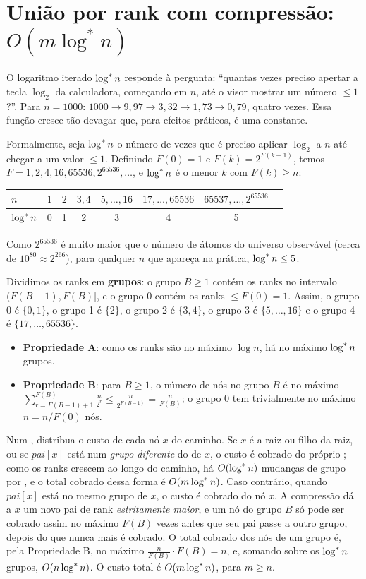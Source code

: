 \section{\texorpdfstring{União por rank com compressão: $O(m\log^*n)$}{União por rank com compressão: O(m log* n)}}\label{sec:uflogstar}
\begin{intuicao}
O logaritmo iterado $\log^{*} n$ responde à pergunta: ``quantas vezes preciso apertar a tecla $\log_2$ da calculadora, começando em $n$, até o visor mostrar um número $\le1$?''. Para $n=1000$: $1000\to9{,}97\to3{,}32\to1{,}73\to0{,}79$, quatro vezes. Essa função cresce tão devagar que, para efeitos práticos, é uma constante.
\end{intuicao}

Formalmente, seja $\log^{*} n$ o número de vezes que é preciso aplicar $\log_2$ a $n$ até chegar a um valor $\le1$. Definindo $F(0)=1$ e $F(k)=2^{F(k-1)}$, temos $F=1,2,4,16,65536,2^{65536},\dots$, e $\log^{*} n$ é o menor $k$ com $F(k)\ge n$:
\begin{center}\small
\begin{tabular}{@{}lccccccc@{}}
\toprule
$n$ & $1$ & $2$ & $3,4$ & $5,\dots,16$ & $17,\dots,65536$ & $65537,\dots,2^{65536}$\\
\midrule
$\log^{*} n$ & 0 & 1 & 2 & 3 & 4 & 5\\
\bottomrule
\end{tabular}
\end{center}
Como $2^{65536}$ é muito maior que o número de átomos do universo observável (cerca de $10^{80}\approx2^{266}$), para qualquer $n$ que apareça na prática, $\log^{*} n\le5$.

Dividimos os ranks em \textbf{grupos}: o grupo $B\ge1$ contém os ranks no intervalo $(F(B-1),F(B)]$, e o grupo 0 contém os ranks $\le F(0)=1$. Assim, o grupo 0 é $\{0,1\}$, o grupo 1 é $\{2\}$, o grupo 2 é $\{3,4\}$, o grupo 3 é $\{5,\dots,16\}$ e o grupo 4 é $\{17,\dots,65536\}$.
\begin{itemize}
  \item \textbf{Propriedade A}: como os ranks são no máximo $\log n$, há no máximo $\log^{*} n$ grupos.
  \item \textbf{Propriedade B}: para $B\ge1$, o número de nós no grupo $B$ é no máximo $\sum_{r=F(B-1)+1}^{F(B)}\frac{n}{2^r}\le\frac{n}{2^{F(B-1)}}=\frac{n}{F(B)}$; o grupo 0 tem trivialmente no máximo $n=n/F(0)$ nós.
\end{itemize}
Num \Find, distribua o custo de cada nó $x$ do caminho. Se $x$ é a raiz ou filho da raiz, ou se $pai[x]$ está num \emph{grupo diferente} do de $x$, o custo é cobrado do próprio \Find; como os ranks crescem ao longo do caminho, há $O(\log^{*} n)$ mudanças de grupo por \Find, e o total cobrado dessa forma é $O(m\log^{*} n)$. Caso contrário, quando $pai[x]$ está no mesmo grupo de $x$, o custo é cobrado do nó $x$. A compressão dá a $x$ um novo pai de rank \emph{estritamente maior}, e um nó do grupo $B$ só pode ser cobrado assim no máximo $F(B)$ vezes antes que seu pai passe a outro grupo, depois do que nunca mais é cobrado. O total cobrado dos nós de um grupo é, pela Propriedade B, no máximo $\frac{n}{F(B)}\cdot F(B)=n$, e, somando sobre os $\log^{*} n$ grupos, $O(n\log^{*} n)$. O custo total é $O(m\log^{*} n)$, para $m\ge n$.

